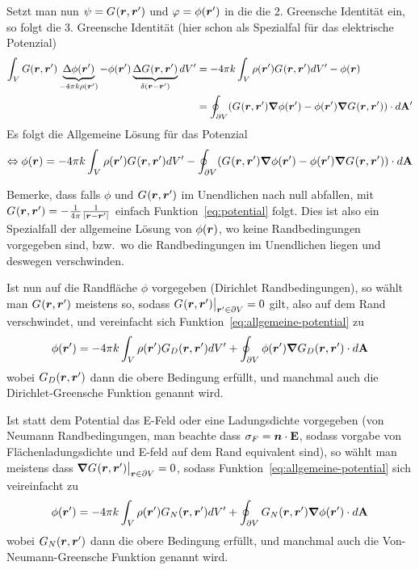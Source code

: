 Setzt man nun $\psi=\green$ und $\varphi=\phi(\vr')$ in die die 2.
Greensche Identität ein, so folgt die 3. Greensche Identität (hier schon
als Spezialfal für das elektrische Potenzial)
\begin{equation}
  \begin{split}
    \int_V G(\vb*r,\vb*r')\underbrace{\Delta\phi(\vb*r')}_{%
    -4\pi k\rho(\vb*r')} 
    - \phi(\vb*r')\underbrace{\Delta \green}_{\delta(\vb*r - \vb*r')}
    dV'
    &= -4\pi k\int_V \rho(\vb*r') \green dV' -\phi(\vb*r)\\
    &= \oint_{\partial V} (\green\grad\phi(\vr')-\phi(\vr')\grad\green)\ddA'\\
  \end{split}
\end{equation}
Es folgt die Allgemeine Lösung für das Potenzial
\begin{equation}
  \label{eq:allgemeine-potential}
  \Leftrightarrow \phi(\vr) = -4\pi k\int_V \rho(\vr')\green dV' 
  - \oint_{\partial V} (\green\grad\phi(\vr')-\phi(\vr')\grad\green)\ddA
\end{equation}

Bemerke, dass falls $\phi$ und $\green$ im Unendlichen nach null abfallen,
mit $\green=-\frac{1}{4\pi} \frr $ einfach Funktion~\ref{eq:potential} folgt.
Dies ist also ein Spezialfall der allgemeine Lösung von $\phi(\vr)$, wo
keine Randbedingungen vorgegeben sind, bzw.\ wo die Randbedingungen im
Unendlichen liegen und deswegen verschwinden.

Ist nun auf die Randfläche $\phi$ vorgegeben (Dirichlet Randbedingungen), 
so wählt man $\green$ meistens so,
sodass $\green\big|_{\vr'\in\partial V}= 0$ gilt, also auf dem Rand 
verschwindet, und vereinfacht sich Funktion~\ref{eq:allgemeine-potential} zu
\begin{equation}
  \label{eq:dirichlet-green-potential}
  \phi(\vb*r') = -4\pi k\int_V \rho(\vr')\green[D] dV' 
  + \oint_{\partial V} \phi(\vr')\grad\green[D] \ddA
\end{equation}
wobei $\green[D]$ dann die obere Bedingung erfüllt, und manchmal
auch die Dirichlet-Greensche Funktion genannt wird.

Ist statt dem Potential das E-Feld oder eine Ladungsdichte vorgegeben 
(von Neumann Randbedingungen, man beachte dass $\sigma_F=\vb*n\cdot\vb E$,
sodass vorgabe von Flächenladungsdichte und E-feld auf dem Rand equivalent 
sind), so wählt man meistens dass $\grad\green\big|_{\vr\in\partial V}=0$,
sodass Funktion~\ref{eq:allgemeine-potential} sich veireinfacht zu
\begin{equation}
  \phi(\vb*r') = -4\pi k\int_V \rho(\vr')\green[N] dV' 
  + \oint_{\partial V} \green[N]\grad\phi(\vr') \ddA
\end{equation}
wobei $\green[N]$ dann die obere Bedingung erfüllt, und manchmal
auch die Von-Neumann-Greensche Funktion genannt wird.


